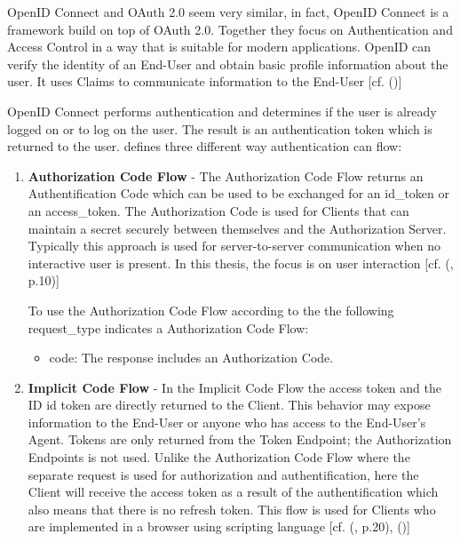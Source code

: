 {OpenID Connect and OAuth 2.0 seem very similar, in fact, OpenID Connect is a framework build on top of OAuth 2.0. Together they focus on Authentication and Access Control in a way that is suitable for modern applications. OpenID can verify the identity of an End-User and obtain basic profile information about the user. It uses Claims to communicate information to the End-User [cf. (\cite{Sakimura:2014:OpenIDConnect})]

OpenID Connect performs authentication and determines if the user is already logged on or to log on the user. The result is an authentication token which is returned to the user. \cite{Sakimura:2014:OpenIDConnect} defines three different way authentication can flow:


\begin{enumerate}
	\item \textbf{Authorization Code Flow}  - The Authorization Code Flow returns an Authentification Code which can be used to be exchanged for an id\_token or an access\_token. The Authorization Code is used for Clients that can maintain a secret securely between themselves and the Authorization Server. Typically this approach is used for server-to-server communication when no interactive user is present. In this thesis, the focus is on user interaction [cf. (\cite{Sakimura:2014:OpenIDConnect}, p.10)]
	
	To use the Authorization Code Flow according to \cite{Sakimura:2014:OpenIDConnect} the the following request\_type indicates a Authorization Code Flow:
	\begin{itemize}
		\item	code: The response includes an Authorization Code. 
	\end{itemize}
	
	\item \textbf{Implicit Code Flow} - In the Implicit Code Flow the access token and the ID id token are directly returned to the Client. This behavior may expose information to the End-User or anyone who has access to the End-User’s Agent. Tokens are only returned from the Token Endpoint; the Authorization Endpoints is not used. Unlike the Authorization Code Flow where the separate request is used for authorization and authentification, here the Client will receive the access token as a result of the authentification which also means that there is no refresh token.  This flow is used for Clients who are implemented in a browser using scripting language [cf. (\cite{Sakimura:2014:OpenIDConnect}, p.20), (\cite{Hardt:2012:OAuth2})]
	

\end{enumerate}}
